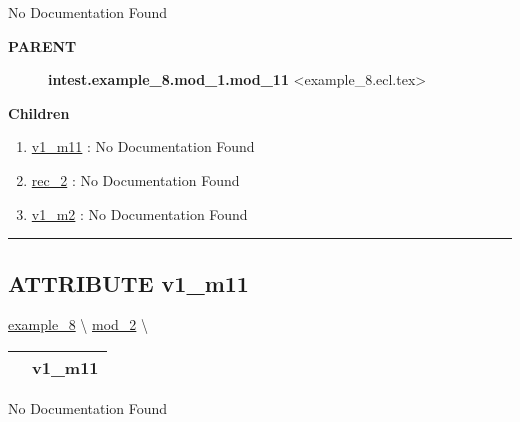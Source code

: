 No Documentation Found










\par
\begin{description}
\item [\colorbox{tagtype}{\color{white} \textbf{\textsf{PARENT}}}] \textbf{intest.example\_8.mod\_1.mod\_11} <example\_8.ecl.tex>
\end{description}


\textbf{Children}
\begin{enumerate}
\item \hyperlink{ecldoc:intest.example_8.mod_1.mod_11.v1_m11}{v1\_m11}
: No Documentation Found
\item \hyperlink{ecldoc:intest.example_8.mod_2.rec_2}{rec\_2}
: No Documentation Found
\item \hyperlink{ecldoc:intest.example_8.mod_2.v1_m2}{v1\_m2}
: No Documentation Found
\end{enumerate}

\rule{\linewidth}{0.5pt}

\subsection*{\textsf{\colorbox{headtoc}{\color{white} ATTRIBUTE}
v1\_m11}}

\hypertarget{ecldoc:intest.example_8.mod_1.mod_11.v1_m11}{}
\hspace{0pt} \hyperlink{ecldoc:intest.example_8}{example_8} \textbackslash 
\hspace{0pt} \hyperlink{ecldoc:intest.example_8.mod_2}{mod_2} \textbackslash 

{\renewcommand{\arraystretch}{1.5}
\begin{tabularx}{\textwidth}{|>{\raggedright\arraybackslash}l|X|}
\hline
\hspace{0pt}\mytexttt{\color{red} } & \textbf{v1\_m11} \\
\hline
\end{tabularx}
}

\par





No Documentation Found








